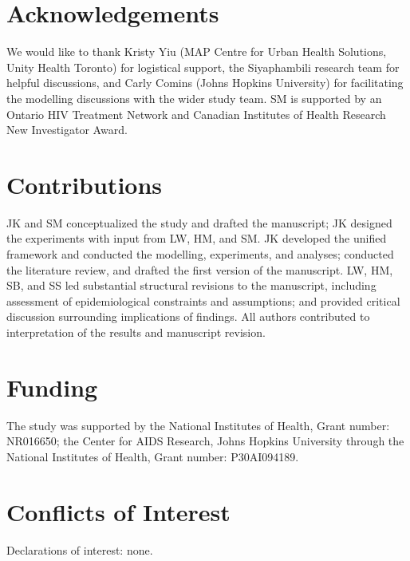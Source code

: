 \section*{Acknowledgements}
We would like to thank
Kristy Yiu (MAP Centre for Urban Health Solutions, Unity Health Toronto) for logistical support,
the Siyaphambili research team for helpful discussions,
and Carly Comins (Johns Hopkins University)
for facilitating the modelling discussions with the wider study team.
SM is supported by an Ontario HIV Treatment Network and
Canadian Institutes of Health Research New Investigator Award.
\section*{Contributions}
JK and SM conceptualized the study and drafted the manuscript;
JK designed the experiments with input from LW, HM, and SM.
JK developed the unified framework and conducted the modelling, experiments,
and analyses; conducted the literature review, and drafted the first version of the manuscript. 
LW, HM, SB, and SS led substantial structural
revisions to the manuscript, including assessment of epidemiological constraints and assumptions;
and provided critical discussion surrounding implications of findings.
All authors contributed to interpretation of the results and manuscript revision.
\section*{Funding}
The study was supported by
the National Institutes of Health, Grant number: NR016650;
the Center for AIDS Research, Johns Hopkins University
  through the National Institutes of Health, Grant number: P30AI094189.
\section*{Conflicts of Interest}
Declarations of interest: none.
